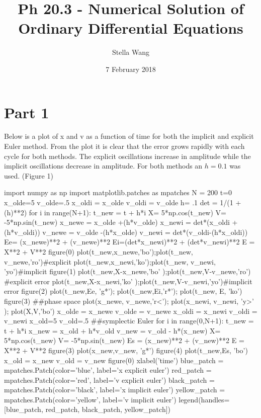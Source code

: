 \documentclass{article}
\title{Ph 20.3 - Numerical Solution of Ordinary Differential Equations}
\author{Stella Wang}
\date{ 7 February 2018}
\begin{document}
	\maketitle
\section{Part 1}

Below is a plot of x and v as a function of time for both the implicit and explicit Euler method. From the plot it is clear that the error grows rapidly with each cycle for both methods. The explicit oscillations increase in amplitude while the implicit oscillations decrease in amplitude. For both methods an $h = 0.1$ was used. (Figure 1)

\begin{pylabcode}[firstsession]
import numpy as np
import matplotlib.patches as mpatches
N = 200
t=0
x_olde=5
v_olde=.5
x_oldi = x_olde
v_oldi = v_olde
h= .1
det = 1/(1 + (h)**2)
for i in range(N+1): 
    t_new = t + h*i
    X= 5*np.cos(t_new)
    V= -5*np.sin(t_new)
    x_newe = x_olde +(h*v_olde)
    x_newi = det*(x_oldi +(h*v_oldi))
    v_newe = v_olde -(h*x_olde)
    v_newi = det*(v_oldi-(h*x_oldi))
    Ee= (x_newe)**2 + (v_newe)**2
    Ei=(det*x_newi)**2 + (det*v_newi)**2
    E = X**2 + V**2
    figure(0)
    plot(t_new,x_newe,'bo');plot(t_new, v_newe,'ro')#explicit
    plot(t_new,x_newi,'ko');plot(t_new, v_newi, 'yo')#implicit
    figure(1)
    plot(t_new,X-x_newe,'bo' );plot(t_new,V-v_newe,'ro') #explicit error
    plot(t_new,X-x_newi,'ko' );plot(t_new,V-v_newi,'yo')#implicit error
    figure(2)
    plot(t_new,Ee, 'g*'); plot(t_new,Ei,'r*'); plot(t_new, E, 'ko')
    figure(3)
    ##phase space
    plot(x_newe, v_newe,'r<'); plot(x_newi, v_newi, 'y>' ); plot(X,V,'bo')
    x_olde = x_newe
    v_olde = v_newe
    x_oldi = x_newi
    v_oldi = v_newi
x_old=5
v_old=.5  
##symplectic Euler
for i in range(0,N+1):
    t_new = t + h*i
    x_new = x_old + h*v_old
    v_new = v_old - h*(x_new)
    X= 5*np.cos(t_new)
    V= -5*np.sin(t_new)
    Es = (x_new)**2 + (v_new)**2
    E = X**2 + V**2
    figure(3)
    plot(x_new,v_new, 'g*')
    figure(4)
    plot(t_new,Es, 'bo')
    x_old = x_new
    v_old = v_new
figure(0)
xlabel('time')
blue_patch = mpatches.Patch(color='blue', label='x explicit euler')
red_patch = mpatches.Patch(color='red', label='v explicit euler')
black_patch = mpatches.Patch(color='black', label='x implicit euler')
yellow_patch = mpatches.Patch(color='yellow', label='v implicit euler')
legend(handles=[blue_patch, red_patch, black_patch, yellow_patch])

\end{pylabcode}
\end{document}
